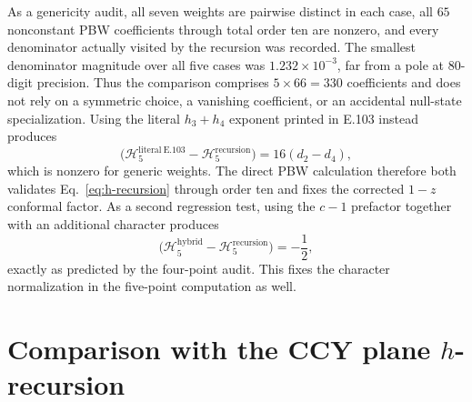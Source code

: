 \documentclass[11pt]{article}
\newcommand{\cH}{\mathcal H}
\begin{document}
As a genericity audit, all seven weights are pairwise distinct in each case,
all $65$ nonconstant PBW coefficients through total order ten are nonzero,
and every denominator actually visited by the recursion was recorded.  The
smallest denominator magnitude over all five cases was
$1.232\times10^{-3}$, far from a pole at $80$-digit precision.  Thus the
comparison comprises $5\times66=330$ coefficients and does not rely on a
symmetric choice, a vanishing coefficient, or an accidental null-state
specialization.
Using the literal $h_3+h_4$ exponent printed in E.103 instead produces
\begin{equation}
 [p_1p_2]\bigl(\cH_5^{\mathrm{literal\ E.103}}
                   -\cH_5^{\mathrm{recursion}}\bigr)
 =16(d_2-d_4),
 \label{eq:e103-pbw-obstruction}
\end{equation}
which is nonzero for generic weights.  The direct PBW calculation therefore
both validates Eq.~\eqref{eq:h-recursion} through order ten and fixes the
corrected $1-z$ conformal factor.  As a second regression test, using the
$c-1$ prefactor together with an additional character produces
\begin{equation}
 [p_1^2p_2^2]\bigl(\cH_5^{\mathrm{hybrid}}
                         -\cH_5^{\mathrm{recursion}}\bigr)
 =-\frac12,
 \label{eq:five-point-character-obstruction}
\end{equation}
exactly as predicted by the four-point audit.  This fixes the character
normalization in the five-point computation as well.

\section{Comparison with the CCY plane \texorpdfstring{$h$}{h}-recursion}
\end{document}
